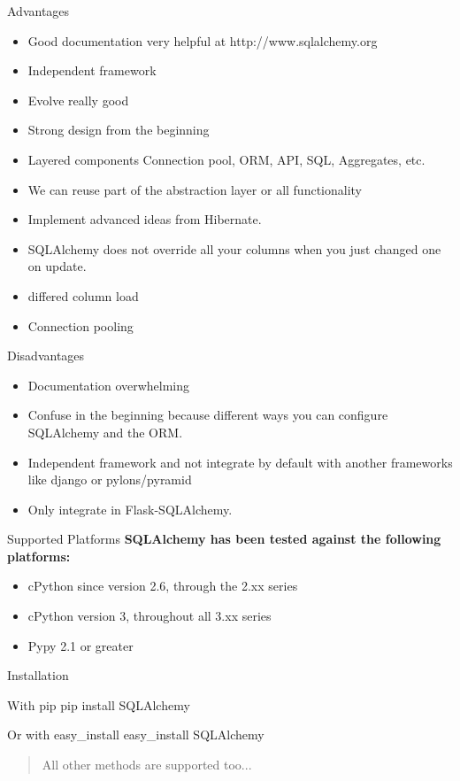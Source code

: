 \documentclass[seagull]{beamer}
\begin{document}
\begin{frame}{Advantages}
\begin{itemize}
	\item Good documentation very helpful at http://www.sqlalchemy.org
	\item Independent framework
	\item Evolve really good
	\item Strong design from the beginning
	\item Layered components Connection pool, ORM, API, SQL, Aggregates, etc.
	\item We can reuse part of the abstraction layer or all functionality
	\item Implement advanced ideas from Hibernate.
	\item SQLAlchemy does not override all your columns when you just changed one on update.
	\item differed column load
	\item Connection pooling
\end{itemize}
\end{frame}

\begin{frame}{Disadvantages}
\begin{itemize}
	\item Documentation overwhelming
	\item Confuse in the beginning because different ways you can configure SQLAlchemy and the ORM.
	\item Independent framework and not integrate by default with another frameworks like django or pylons/pyramid
	\item Only integrate in Flask-SQLAlchemy.
\end{itemize}
\end{frame}

\begin{frame}{Supported Platforms}
	\textbf{SQLAlchemy has been tested against the following platforms:}
	\begin{itemize}
		\item cPython since version 2.6, through the 2.xx series
		\item cPython version 3, throughout all 3.xx series
		\item Pypy 2.1 or greater
	\end{itemize}
\end{frame}
\begin{frame}{Installation}
	\begin{block}{With pip}
		pip install SQLAlchemy
	\end{block} 
	\begin{block}{Or with easy\_install}
		easy\_install SQLAlchemy
	\end{block}
	\begin{quote}
	All other methods are supported too...
	\end{quote}
\end{frame}
\end{document}
